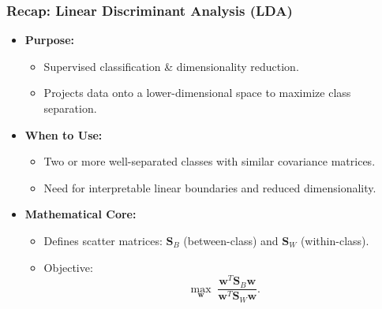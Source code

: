 \documentclass[aspectratio=169]{beamer}
\begin{document}
\begin{frame}
    \frametitle{Recap: Linear Discriminant Analysis (LDA)}
    \begin{itemize}
        \item \textbf{Purpose:}
            \begin{itemize}
                \item Supervised classification \& dimensionality reduction.
                \item Projects data onto a lower-dimensional space to maximize class separation.
            \end{itemize}
        \item \textbf{When to Use:}
            \begin{itemize}
                \item Two or more well-separated classes with similar covariance matrices.
                \item Need for interpretable linear boundaries and reduced dimensionality.
            \end{itemize}
        \item \textbf{Mathematical Core:}
            \begin{itemize}
                \item Defines scatter matrices: \(\mathbf{S}_B\) (between-class) and \(\mathbf{S}_W\) (within-class).
                \item Objective: 
                \[
                    \max_{\mathbf{w}} \; \frac{\mathbf{w}^T \mathbf{S}_B \mathbf{w}}{\mathbf{w}^T \mathbf{S}_W \mathbf{w}}.
                \]
            \end{itemize}
    \end{itemize}
\end{frame}
\end{document}
